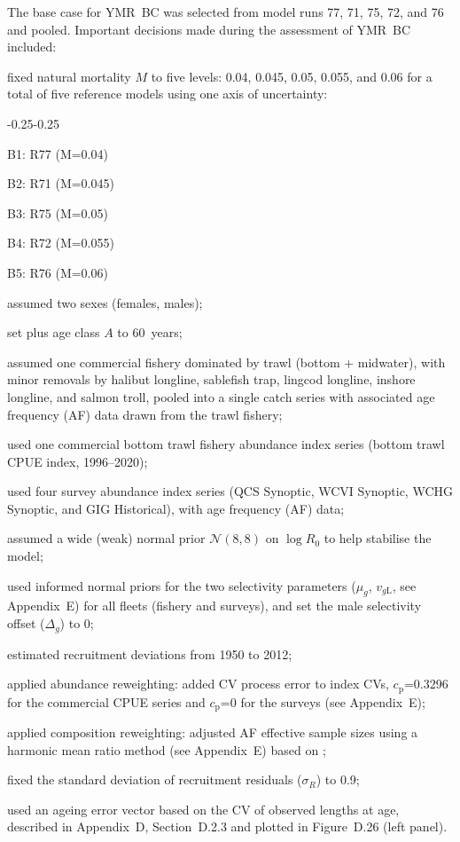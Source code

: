 \documentclass[11pt]{book}
\newcommand{\AppBio}{Appendix~D}
\newcommand{\AppEqn}{Appendix~E}
\begin{document}
The base case for YMR~BC was selected from model runs 77, 71, 75, 72, and 76 and pooled.
Important decisions made during the assessment of YMR~BC included:
\begin{itemize_csas}{}{}
  \item fixed natural mortality $M$ to five levels: 0.04, 0.045, 0.05, 0.055, and 0.06 for a total of five reference models using one axis of uncertainty:
  \begin{itemize_csas}{-0.25}{-0.25}
    \item B1: R77 (M=0.04)
    \item B2: R71 (M=0.045)
    \item B3: R75 (M=0.05)
    \item B4: R72 (M=0.055)
    \item B5: R76 (M=0.06)  %
  \end{itemize_csas}
  \item assumed two sexes (females, males);
  \item set plus age class $A$ to 60~years;
  \item assumed one commercial fishery dominated by trawl (bottom + midwater), with minor removals by halibut longline, sablefish trap, lingcod longline, inshore longline, and salmon troll, pooled into a single catch series with associated age frequency (AF) data drawn from the trawl fishery;
  \item used one commercial bottom trawl fishery abundance index series (bottom trawl CPUE index, 1996--2020);
  \item used four survey abundance index series (QCS Synoptic, WCVI Synoptic, WCHG Synoptic, and GIG Historical), with age frequency (AF) data;
  \item assumed a wide (weak) normal prior $\mathcal{N}(8,8)$ on $\log R_0$ to help stabilise the model; 
  \item used informed normal priors for the two selectivity parameters ($\mu_g$, $v_{g\text{L}}$, see \AppEqn) for all fleets (fishery and surveys), and set the male selectivity offset ($\Delta_{g}$) to 0;
  \item estimated recruitment deviations from 1950 to 2012;
  \item applied abundance reweighting: added CV process error to index CVs, $c_\text{p}$=0.3296 for the commercial CPUE series and $c_\text{p}$=0 for the surveys (see \AppEqn);
  \item applied composition reweighting: adjusted AF effective sample sizes using a harmonic mean ratio method (see \AppEqn) based on \citet{McAllister-Ianelli:1997};
  \item fixed the standard deviation of recruitment residuals ($\sigma_R$) to 0.9;
  \item used an ageing error vector based on the CV of observed lengths at age, described in \AppBio, Section~D.2.3 and plotted in Figure~D.26 (left panel).
\end{itemize_csas}
\end{document}
